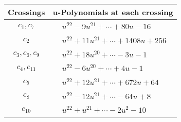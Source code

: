\documentclass[1p]{elsarticle_modified}
\theoremstyle{definition}
\begin{document}
\begin{tabular}{m{50pt}|m{274pt}}
Crossings & \hspace{64pt}u-Polynomials at each crossing \\
\hline $$\begin{aligned}c_{1},c_{7}\end{aligned}$$&$\begin{aligned}
&u^{22}-9 u^{21}+\cdots+80 u-16
\end{aligned}$\\
\hline $$\begin{aligned}c_{2}\end{aligned}$$&$\begin{aligned}
&u^{22}+11 u^{21}+\cdots+1408 u+256
\end{aligned}$\\
\hline $$\begin{aligned}c_{3},c_{6},c_{9}\end{aligned}$$&$\begin{aligned}
&u^{22}+18 u^{20}+\cdots-3 u-1
\end{aligned}$\\
\hline $$\begin{aligned}c_{4},c_{11}\end{aligned}$$&$\begin{aligned}
&u^{22}-6 u^{20}+\cdots+4 u-1
\end{aligned}$\\
\hline $$\begin{aligned}c_{5}\end{aligned}$$&$\begin{aligned}
&u^{22}+12 u^{21}+\cdots+672 u+64
\end{aligned}$\\
\hline $$\begin{aligned}c_{8}\end{aligned}$$&$\begin{aligned}
&u^{22}-12 u^{21}+\cdots-64 u+8
\end{aligned}$\\
\hline $$\begin{aligned}c_{10}\end{aligned}$$&$\begin{aligned}
&u^{22}+u^{21}+\cdots-2 u^2-10
\end{aligned}$\\
\hline
\end{tabular}\\~\\
\newpage\renewcommand{\arraystretch}{1}
\end{document}
